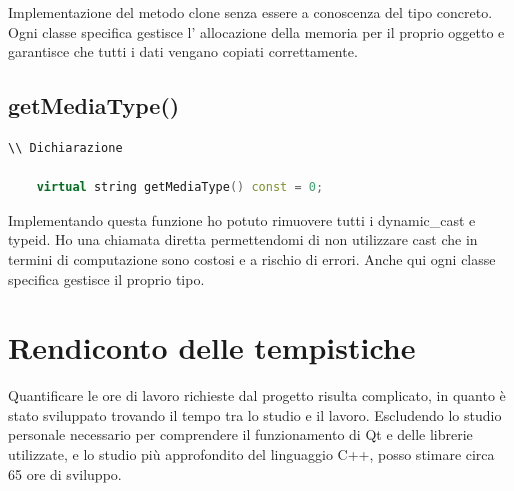 \documentclass[a4paper,12pt]{article}
\begin{document}
Implementazione del metodo clone senza essere a conoscenza del tipo concreto. Ogni classe specifica gestisce l' allocazione della memoria per il proprio oggetto e garantisce che tutti i dati vengano copiati correttamente.

\subsection{getMediaType()}

\begin{lstlisting}[language=cpp, style=cppstyle]
\\ Dichiarazione

    virtual string getMediaType() const = 0;
\end{lstlisting}

Implementando questa funzione ho potuto rimuovere tutti i dynamic\_cast e typeid. Ho una chiamata diretta permettendomi di non utilizzare cast che in termini di computazione sono costosi e a rischio di errori. Anche qui ogni classe specifica gestisce il proprio tipo.

\section{Rendiconto delle tempistiche}
Quantificare le ore di lavoro richieste dal progetto risulta complicato, in quanto è stato sviluppato trovando il tempo tra lo studio e il lavoro. Escludendo lo studio personale necessario per comprendere il funzionamento di Qt e delle librerie utilizzate, e lo studio più approfondito del linguaggio C++, posso stimare circa 65 ore di sviluppo.
\end{document}
